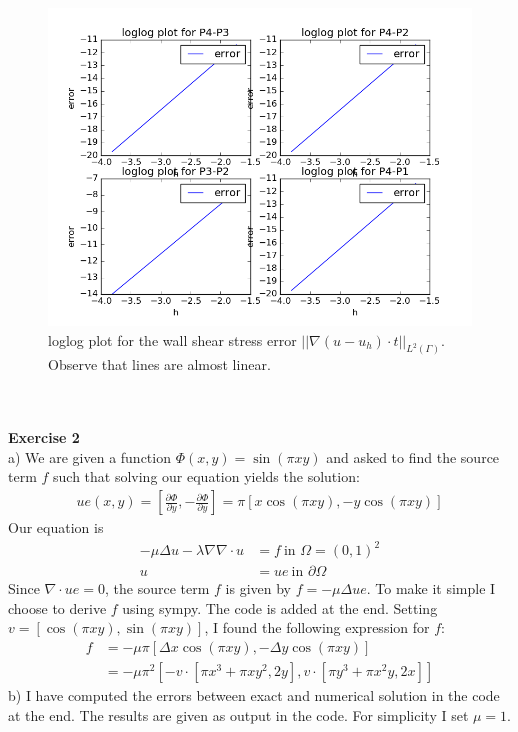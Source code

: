 \documentclass[11pt,a4paper]{report}
\begin{document}
\begin{figure}
  \includegraphics[width=\linewidth]{stress_con.png}
  \caption{loglog plot for the wall shear stress error $||\nabla (u-u_h)\cdot t||_{L^2(\Gamma)}$. Observe that lines are almost linear.}
  \label{Fig 2}
\end{figure}
\\
\\
\textbf{Exercise 2}
\\
a) We are given a function $\Phi(x,y)=\sin(\pi xy)$ and asked to find the source term $f$ such that solving our equation yields the solution:
\begin{align*}
ue(x,y)=[\frac{\partial \Phi}{\partial y},-\frac{\partial \Phi}{\partial y}]= \pi[x\cos(\pi xy),-y\cos(\pi xy)]
\end{align*}
Our equation is 
\begin{align*}
-\mu \Delta u -\lambda\nabla\nabla\cdot u &= f \ \text{in } \Omega=(0,1)^2 \\
u&=ue \ \text{in } \partial\Omega
\end{align*}
Since $\nabla\cdot ue=0$, the source term $f$ is given by $f=-\mu \Delta ue$. To make it simple I choose to derive $f$ using sympy. The code is added at the end. Setting $v=[\cos(\pi xy),\sin(\pi xy)]$, I found the following expression for $f$:
\begin{align*}
f &= -\mu\pi[\Delta x\cos(\pi xy),-\Delta y\cos(\pi xy)] \\
&= -\mu\pi^2[-v\cdot [\pi x^3+\pi xy^2,2y],v\cdot [\pi y^3+\pi x^2y,2x]]
\end{align*}
b) I have computed the errors between exact and numerical solution in the code at the end. The results are given as output in the code. For simplicity I set $\mu=1$.
\end{document}
